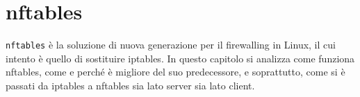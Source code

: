 \chapter{nftables}

\texttt{nftables} è la soluzione di nuova generazione per il firewalling in
Linux, il cui intento è quello di sostituire iptables.
In questo capitolo si analizza come funziona nftables, come e perché è migliore
del suo predecessore, e soprattutto, come si è passati da iptables a nftables
sia lato server sia lato client.






